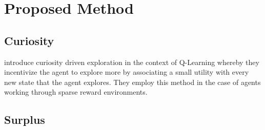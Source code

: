\section{Proposed Method}

\subsection{Curiosity}
 introduce curiosity driven exploration in the context of Q-Learning whereby they incentivize the agent to explore more by associating a small utility with every new state that the agent explores. They employ this method in the case of agents working through sparse reward environments.

\subsection{Surplus}

